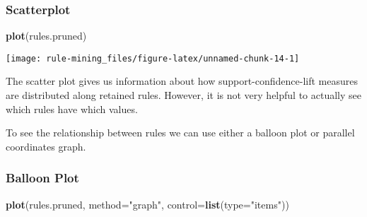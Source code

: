 \documentclass[]{article}
\newenvironment{Shaded}{\begin{snugshade}}{\end{snugshade}}
\newcommand{\DataTypeTok}[1]{\textcolor[rgb]{0.13,0.29,0.53}{#1}}
\newcommand{\KeywordTok}[1]{\textcolor[rgb]{0.13,0.29,0.53}{\textbf{#1}}}
\newcommand{\NormalTok}[1]{#1}
\newcommand{\StringTok}[1]{\textcolor[rgb]{0.31,0.60,0.02}{#1}}
\begin{document}
\hypertarget{scatterplot}{%
\subsubsection{Scatterplot}\label{scatterplot}}

\begin{Shaded}
\begin{Highlighting}[]
\KeywordTok{plot}\NormalTok{(rules.pruned)}
\end{Highlighting}
\end{Shaded}

\begin{center}\texttt{[image: rule-mining\_files/figure-latex/unnamed-chunk-14-1]} \end{center}

The scatter plot gives us information about how support-confidence-lift
measures are distributed along retained rules. However, it is not very
helpful to actually see which rules have which values.

To see the relationship between rules we can use either a balloon plot
or parallel coordinates graph.

\hypertarget{balloon-plot}{%
\subsubsection{Balloon Plot}\label{balloon-plot}}

\begin{Shaded}
\begin{Highlighting}[]
\KeywordTok{plot}\NormalTok{(rules.pruned, }\DataTypeTok{method=}\StringTok{"graph"}\NormalTok{, }\DataTypeTok{control=}\KeywordTok{list}\NormalTok{(}\DataTypeTok{type=}\StringTok{"items"}\NormalTok{))}
\end{Highlighting}
\end{Shaded}
\end{document}
